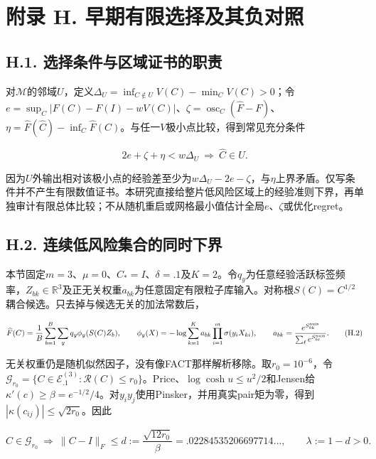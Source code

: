 \documentclass[11pt,a4paper]{article}
\begin{document}
\section*{附录 H.
早期有限选择及其负对照}\label{ux9644ux5f55-h.-ux65e9ux671fux6709ux9650ux9009ux62e9ux53caux5176ux8d1fux5bf9ux7167}

\subsection*{H.1.
选择条件与区域证书的职责}\label{h.1.-ux9009ux62e9ux6761ux4ef6ux4e0eux533aux57dfux8bc1ux4e66ux7684ux804cux8d23}

对\(\mathcal M\)的邻域\(U\)，定义\(\Delta_U=\inf_{C\notin U}V(C)-\min_CV(C)>0\)；令\(e=\sup_C|F(C)-F(I)-wV(C)|\)、\(\zeta=\operatorname{osc}_C(\widehat F-F)\)、\(\eta=\widehat F(\widehat C)-\inf_C\widehat F(C)\)。与任一\(V\)极小点比较，得到常见充分条件

\[
2e+\zeta+\eta<w\Delta_U\ \Longrightarrow\ \widehat C\in U.
\tag{H.1}
\]

因为\(U\)外输出相对该极小点的经验差至少为\(w\Delta_U-2e-\zeta\)，与\(\eta\)上界矛盾。仅写条件并不产生有限数值证书。本研究直接给整片低风险区域上的经验准则下界，再单独审计有限总体比较；不从随机重启或网格最小值估计全局\(e\)、\(\zeta\)或优化regret。

\subsection*{H.2.
连续低风险集合的同时下界}\label{h.2.-ux8fdeux7eedux4f4eux98ceux9669ux96c6ux5408ux7684ux540cux65f6ux4e0bux754c}

本节固定\(m=3\)、\(\mu=0\)、\(C_*=I\)、\(\delta=.1\)及\(K=2\)。令\(q_y\)为任意经验活跃标签频率，\(Z_{bk}\in\mathbb R^3\)及正无关权重\(a_{bk}\)为任意固定有限粒子库输入。对称根\(S(C)=C^{1/2}\)耦合候选。只去掉与候选无关的加法常数后，

\[
\widehat F(C)=\frac1B\sum_{b=1}^{B}\sum_yq_y\phi_y(S(C)Z_b),\qquad
\phi_y(X)=-\log\sum_{k=1}^K a_{bk}\prod_{i=1}^m\sigma(y_iX_{ki}),\qquad
a_{bk}=\frac{e^{S_{bk}^{\rm nuis}}}{\sum_\ell e^{S_{b\ell}^{\rm nuis}}}.
\tag{H.2}
\]

无关权重仍是随机似然因子，没有像FACT那样解析移除。取\(r_0=10^{-6}\)，令\(\mathcal G_{r_0}=\{C\in\mathcal E_{.1}^{(3)}:\mathcal R(C)\le r_0\}\)。Price、\(\log\cosh u\le u^2/2\)和Jensen给\(\kappa'(c)\ge\beta=e^{-1/2}/4\)。对\(y_iy_j\)使用Pinsker，并用真实pair矩为零，得到\(|\kappa(c_{ij})|\le\sqrt{2r_0}\)。因此

\[
C\in\mathcal G_{r_0}\ \Longrightarrow\
\|C-I\|_F\le d:=\frac{\sqrt{12r_0}}{\beta}=.02284535206697714\ldots,
\qquad\lambda:=1-d>0.
\tag{H.3}
\]
\end{document}
